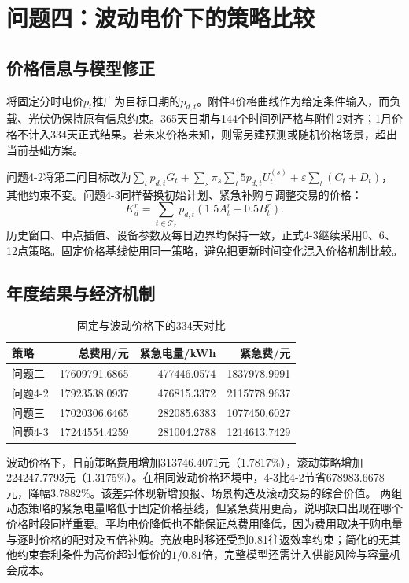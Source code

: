\section{问题四：波动电价下的策略比较}
\subsection{价格信息与模型修正}
将固定分时电价$p_t$推广为目标日期的$p_{d,t}$。附件4价格曲线作为给定条件输入，而负载、光伏仍保持原有信息约束。365天日期与144个时间列严格与附件2对齐；1月价格不计入334天正式结果。若未来价格未知，则需另建预测或随机价格场景，超出当前基础方案。

问题4-2将第二问目标改为$\sum_tp_{d,t}G_t+\sum_s\pi_s\sum_t5p_{d,t}U_t^{(s)}+\varepsilon\sum_t(C_t+D_t)$，其他约束不变。问题4-3同样替换初始计划、紧急补购与调整交易的价格：
\begin{equation}K_d^r=\sum_{t\in\mathcal T_r}p_{d,t}(1.5A_t^r-0.5B_t^r).\end{equation}
历史窗口、中点插值、设备参数及每日边界均保持一致，正式4-3继续采用0、6、12点策略。固定价格基线使用同一策略，避免把更新时间变化混入价格机制比较。
\subsection{年度结果与经济机制}

\begin{table}[H]\centering\small
\caption{固定与波动价格下的334天对比}
\begin{tabular}{lrrr}\toprule
策略 & 总费用/元 & 紧急电量/kWh & 紧急费/元\\\midrule
问题二 & 17609791.6865 & 477446.0574 & 1837978.9991\\
问题4-2 & 17923538.0937 & 476815.3372 & 2115778.9637\\
问题三 & 17020306.6465 & 282085.6383 & 1077450.6027\\
问题4-3 & 17244554.4259 & 281004.2788 & 1214613.7429\\
\bottomrule\end{tabular}\end{table}
波动价格下，日前策略费用增加313746.4071元（1.7817\%），滚动策略增加224247.7793元（1.3175\%）。在相同波动价格环境中，4-3比4-2节省678983.6678元，降幅3.7882\%。该差异体现新增预报、场景构造及滚动交易的综合价值。
两组动态策略的紧急电量略低于固定价格基线，但紧急费用更高，说明缺口出现在哪个价格时段同样重要。平均电价降低也不能保证总费用降低，因为费用取决于购电量与逐时价格的配对及五倍补购。充放电时移还受到0.81往返效率约束；简化的无其他约束套利条件为高价超过低价的$1/0.81$倍，完整模型还需计入供能风险与容量机会成本。

